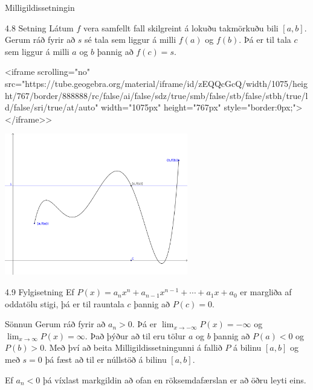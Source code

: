 \documentclass[icelandic,a4paper,12pt]{article}
\begin{document}
\begin{frame}{Milligildissetningin}
 \begin{block}{4.8 Setning}
 Látum $f$ vera samfellt fall skilgreint á lokuðu takmörkuðu bili
$[a,b]$.  Gerum ráð fyrir að $s$ sé tala sem liggur á milli $f(a)$ og
$f(b)$.  Þá er til tala $c$ sem liggur á milli $a$ og $b$ þannig að
$f(c)=s$. 
 \end{block}
<iframe scrolling="no" src="https://tube.geogebra.org/material/iframe/id/zEQQcGcQ/width/1075/height/767/border/888888/rc/false/ai/false/sdz/true/smb/false/stb/false/stbh/true/ld/false/sri/true/at/auto" width="1075px" height="767px" style="border:0px;"> </iframe>>
\begin{center}
 \includegraphics[width=8cm,keepaspectratio=true]{./myndir/kafli01/04_Milligildissetn.png}
\end{center}
\end{frame}

\begin{frame} 
 \begin{block}{4.9 Fylgisetning}
Ef $P(x)=a_nx^n+a_{n-1}x^{n-1}+\cdots+a_1x+a_0$ er margliða af
oddatölu stigi, þá er til rauntala $c$ þannig að $P(c)=0$.
 \end{block}
 \pause
 \begin{block}{Sönnun}
	Gerum ráð fyrir að $a_n>0$. \pause
	Þá er $\lim_{x\to -\infty} P(x) = -\infty$ og
	$\lim_{x\to \infty} P(x) = \infty$.\pause
	Það þýður að til eru tölur $a$ og $b$ 
	þannig að $P(a)<0$ og $P(b)>0$. \pause
	Með því að beita Milligildissetningunni á fallið $P$ á 
	bilinu $[a,b]$ og með $s=0$ þá fæst að til er núllstöð 
	á bilinu $[a,b]$.\pause
	
	Ef $a_n < 0$ þá víxlast markgildin að ofan en röksemdafærslan er
	að öðru leyti eins.
 \end{block}
\end{frame}
\end{document}
